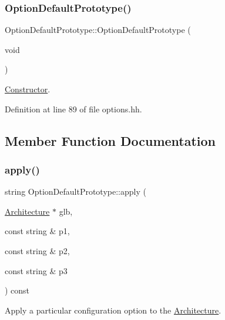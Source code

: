 \subsubsection{\texorpdfstring{OptionDefaultPrototype()}{OptionDefaultPrototype()}}
{\footnotesize\ttfamily Option\+Default\+Prototype\+::\+Option\+Default\+Prototype (\begin{DoxyParamCaption}\item[{void}]{ }\end{DoxyParamCaption})\hspace{0.3cm}{\ttfamily [inline]}}



\mbox{\hyperlink{class_constructor}{Constructor}}. 



Definition at line 89 of file options.\+hh.



\subsection{Member Function Documentation}
\mbox{\label{class_option_default_prototype_af350045f3bd78a0f63b8788fa21ee7f2}} 
\subsubsection{\texorpdfstring{apply()}{apply()}}
{\footnotesize\ttfamily string Option\+Default\+Prototype\+::apply (\begin{DoxyParamCaption}\item[{\mbox{\hyperlink{class_architecture}{Architecture}} $\ast$}]{glb,  }\item[{const string \&}]{p1,  }\item[{const string \&}]{p2,  }\item[{const string \&}]{p3 }\end{DoxyParamCaption}) const\hspace{0.3cm}{\ttfamily [virtual]}}



Apply a particular configuration option to the \mbox{\hyperlink{class_architecture}{Architecture}}. 

